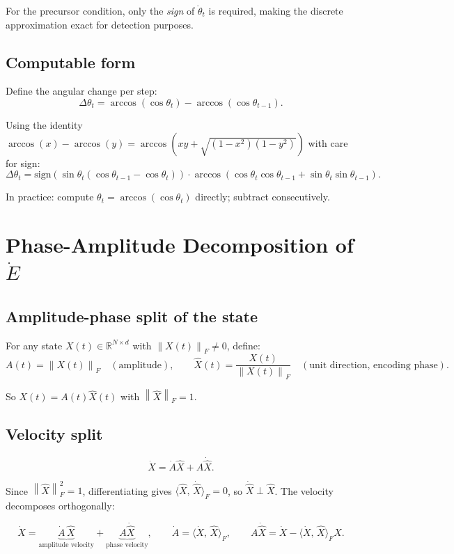 \documentclass[11pt,a4paper]{article}
\theoremstyle{definition}
\newcommand{\R}{\mathbb{R}}
\newcommand{\norm}[1]{\left\|#1\right\|}
\newcommand{\inner}[2]{\langle #1,\,#2\rangle}
\begin{document}
For the precursor condition, only the \emph{sign} of $\ddot\theta_t$ is required, making
the discrete approximation exact for detection purposes.

\subsection{Computable form}

Define the angular change per step:
\[
\Delta\theta_t = \arccos(\cos\theta_t) - \arccos(\cos\theta_{t-1}).
\]

Using the identity $\arccos(x) - \arccos(y) = \arccos(xy + \sqrt{(1-x^2)(1-y^2)})$ with care for sign:
\[
\Delta\theta_t = \mathrm{sign}(\sin\theta_t(\cos\theta_{t-1} - \cos\theta_t))
\cdot \arccos(\cos\theta_t\cos\theta_{t-1} + \sin\theta_t\sin\theta_{t-1}).
\]

In practice: compute $\theta_t = \arccos(\cos\theta_t)$ directly; subtract consecutively.

\section{Phase-Amplitude Decomposition of $\dot E$}

\subsection{Amplitude-phase split of the state}

For any state $X(t) \in \R^{N\times d}$ with $\norm{X(t)}_F \neq 0$, define:
\[
A(t) = \norm{X(t)}_F \quad (\text{amplitude}), \qquad
\hat X(t) = \frac{X(t)}{\norm{X(t)}_F} \quad (\text{unit direction, encoding phase}).
\]

So $X(t) = A(t)\hat X(t)$ with $\norm{\hat X}_F = 1$.

\subsection{Velocity split}

\[
\dot X = \dot A \hat X + A \dot{\hat X}.
\]

Since $\norm{\hat X}_F^2 = 1$, differentiating gives $\inner{\hat X}{\dot{\hat X}}_F = 0$,
so $\dot{\hat X} \perp \hat X$. The velocity decomposes orthogonally:

\begin{lockedbox}
\[
\dot X = \underbrace{\dot A\,\hat X}_{\text{amplitude velocity}} + \underbrace{A\dot{\hat X}}_{\text{phase velocity}},
\qquad \dot A = \inner{\dot X}{\hat X}_F,
\qquad A\dot{\hat X} = \dot X - \inner{\dot X}{\hat X}_F \hat X.
\]
\end{lockedbox}
\end{document}
